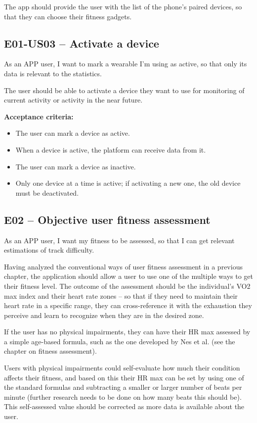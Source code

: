 The app should provide the user with the list of the phone's paired devices, so that they can choose their fitness gadgets.

\subsection*{E01-US03 -- Activate a device}
As an APP user, I want to mark a wearable I'm using as active, so that only its data is relevant to the statistics.

The user should be able to activate a device they want to use for monitoring of current activity or activity in the near future.

\textbf{Acceptance criteria:}
\begin{itemize}
    \item The user can mark a device as active.
    \item When a device is active, the platform can receive data from it.
    \item The user can mark a device as inactive.
    \item Only one device at a time is active; if activating a new one, the old device must be deactivated.
\end{itemize}    

\subsection*{E02 -- Objective user fitness assessment}
As an APP user, I want my fitness to be assessed, so that I can get relevant estimations of track difficulty.

Having analyzed the conventional ways of user fitness assessment in a previous chapter, the application should allow a user to use one of the multiple ways to get their fitness level.
The outcome of the assessment should be the individual's VO2 max index and their heart rate zones -- so that if they need to maintain their heart rate in a specific range, they can cross-reference it with the exhaustion they perceive and learn to recognize when they are in the desired zone.

If the user has no physical impairments, they can have their HR max assessed by a simple age-based formula, such as the one developed by Nes et al. (see the chapter on fitness assessment).

Users with physical impairments could self-evaluate how much their condition affects their fitness, and based on this their HR max can be set by using one of the standard formulas and subtracting a smaller or larger number of beats per minute (further research needs to be done on how many beats this should be).
This self-assessed value should be corrected as more data is available about the user.

